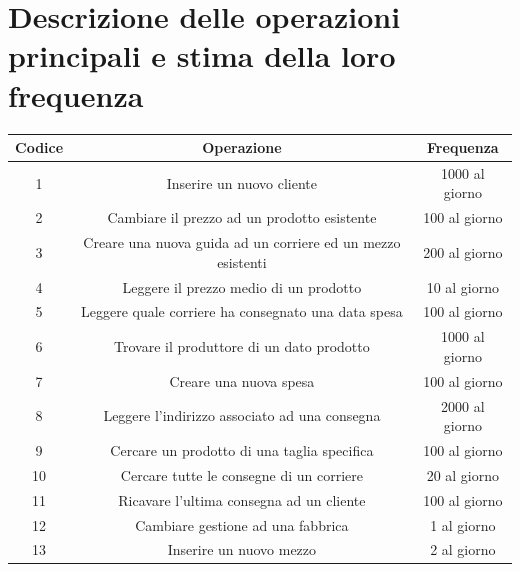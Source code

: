 \documentclass[a4paper,12pt]{report}
\begin{document}
\section{Descrizione delle operazioni principali e stima della loro frequenza}
\begin{center}
    \begin{tabular}{ | c | c | c |} 
    \hline
    Codice&Operazione&Frequenza\\
    \hline
	1&Inserire un nuovo cliente&1000 al giorno\\
	\hline
	2&Cambiare il prezzo ad un prodotto esistente&100 al giorno\\
	\hline
	3&Creare una nuova guida ad un corriere ed un mezzo esistenti&200 al giorno\\
	\hline
	4&Leggere il prezzo medio di un prodotto&10 al giorno\\
	\hline
	5&Leggere quale corriere ha consegnato una data spesa&100 al giorno\\
	\hline
	6&Trovare il produttore di un dato prodotto&1000 al giorno\\
	\hline
	7&Creare una nuova spesa&100 al giorno\\
	\hline
	8&Leggere l'indirizzo associato ad una consegna&2000 al giorno\\
	\hline
	9&Cercare un prodotto di una taglia specifica&100 al giorno\\
	\hline 
	10&Cercare tutte le consegne di un corriere&20 al giorno\\
	\hline
	11&Ricavare l'ultima consegna ad un cliente&100 al giorno\\
	\hline
	12&Cambiare gestione ad una fabbrica&1 al giorno\\
	\hline
	13&Inserire un nuovo mezzo&2 al giorno\\
	\hline
    \end{tabular}
\end{center}
\end{document}

